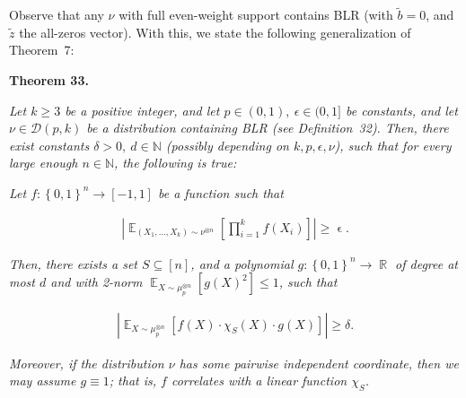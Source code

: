 \documentclass[10pt,a4paper]{article}
\begin{document}



Observe that any $\nu$ with full even-weight support contains BLR (with $\tilde{b}=0$, and $\tilde{z}$ the all-zeros vector).
With this, we state the following generalization of Theorem 7:\par





\par\medskip\noindent\textbf{
\textbf{Theorem 33}\textbf{.}
}\par



\emph{Let $k\geqslant 3$ be a positive integer, and let $p\in(0,1),\ \epsilon\in(0,1]$ be constants, and let $\nu\in\mathcal{D}(p,k)$ be a distribution containing BLR (see Definition 32).
Then, there exist constants $\delta>0,\ d\in\mathbb{N}$ (possibly depending on $k,p,\epsilon,\nu$), such that for every large enough $n\in\mathbb{N}$, the following is true:}\par




\emph{Let $f:\left\{0,1\right\}^{n}\to[-1,1]$ be a function such that}\par


\[\begin{gathered}
\left|\mathop{\mathbb{E}}_{(X_{1},\dots,X_{k})\sim\nu^{\otimes n}}\left[\prod_{i=1}^{k}f(X_{i})\right]\right|\geqslant\mathop{\epsilon}.
\end{gathered}\]


\emph{Then, there exists a set $S\subseteq[n]$, and a polynomial $g:\left\{0,1\right\}^{n}\to\mathop{\mathbb{R}}$ of degree at most $d$ and with 2-norm $\mathop{\mathbb{E}}_{X\sim\mu_{p}^{\otimes n}}\left[g(X)^{2}\right]\leqslant 1$, such that}\par


\[\begin{gathered}
\left|\mathop{\mathbb{E}}_{X\sim\mu_{p}^{\otimes n}}\left[f(X)\cdot\chi_{S}(X)\cdot g(X)\right]\right|\geqslant\delta.
\end{gathered}\]




\emph{Moreover, if the distribution $\nu$ has some pairwise independent coordinate, then we may assume $g\equiv 1$; that is, $f$ correlates with a linear function $\chi_{S}$.}\par
\end{document}
